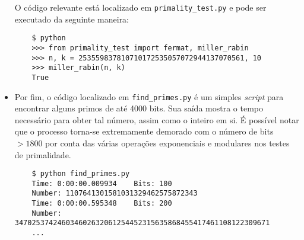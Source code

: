 \documentclass{article}
\begin{document}
\begin{itemize}
O código relevante está localizado em \verb!primality_test.py! e pode ser
executado da seguinte maneira:

\begin{verbatim}
    $ python
    >>> from primality_test import fermat, miller_rabin
    >>> n, k = 253559837810710172535057072944137070561, 10
    >>> miller_rabin(n, k)
    True
\end{verbatim}

\item Por fim, o código localizado em \verb!find_primes.py! é um simples
\emph{script} para encontrar alguns primos de até 4000 bits. Sua saída mostra
o tempo necessário para obter tal número, assim como o inteiro em si. É
possível notar que o processo torna-se extremamente demorado com o número de
bits $> 1800$ por conta das várias operações exponenciais e modulares nos
testes de primalidade.

\begin{verbatim}
    $ python find_primes.py
    Time: 0:00:00.009934    Bits: 100
    Number: 1107641301581031329462575872343
    Time: 0:00:00.595348    Bits: 200
    Number: 347025374246034602632061254452315635868455417461108122309671
    ...
\end{verbatim}

\end{itemize}



\end{document}
